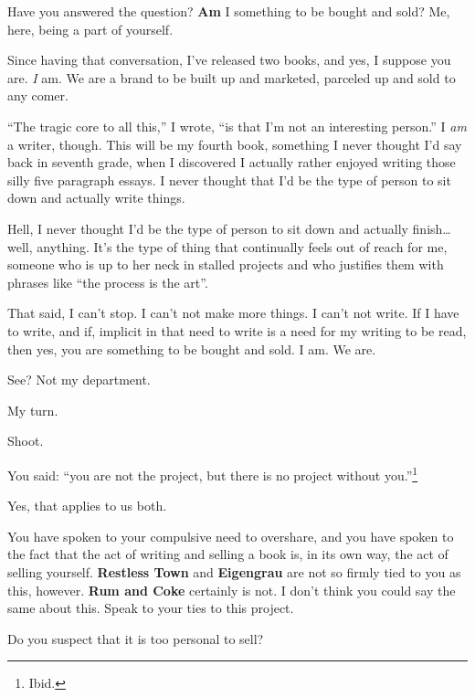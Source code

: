 \begin{paracol}{2}
\begin{leftcolumn}
\begin{ally}
Have you answered the question? \textbf{Am} I something to be bought and sold? Me, here, being a part of yourself.
\end{ally}
Since having that conversation, I've released two books, and yes, I suppose you are. \emph{I} am. We are a brand to be built up and marketed, parceled up and sold to any comer.

``The tragic core to all this,'' I wrote, ``is that I'm not an interesting person.'' I \emph{am} a writer, though. This will be my fourth book, something I never thought I'd say back in seventh grade, when I discovered I actually rather enjoyed writing those silly five paragraph essays. I never thought that I'd be the type of person to sit down and actually write things.

Hell, I never thought I'd be the type of person to sit down and actually finish\ldots{}well, anything. It's the type of thing that continually feels out of reach for me, someone who is up to her neck in stalled projects and who justifies them with phrases like ``the process is the art''.

That said, I can't stop. I can't not make more things. I can't not write. If I have to write, and if, implicit in that need to write is a need for my writing to be read, then yes, you are something to be bought and sold. I am. We are.

\begin{ally}
See? Not my department.
\end{ally}
\newpage

\label{ally:32}
\begin{ally}
My turn.
\end{ally}
Shoot.

\begin{ally}
You said: ``you are not the project, but there is no project without you.''\footnote{Ibid.}
\end{ally}
Yes, that applies to us both.

\begin{ally}
You have spoken to your compulsive need to overshare, and you have spoken to the fact that the act of writing and selling a book is, in its own way, the act of selling yourself. \textbf{Restless Town} and \textbf{Eigengrau} are not so firmly tied to you as this, however. \textbf{Rum and Coke} certainly is not. I don't think you could say the same about this. Speak to your ties to this project.
\end{ally}
Do you suspect that it is too personal to sell?


\end{leftcolumn}
\end{paracol}
